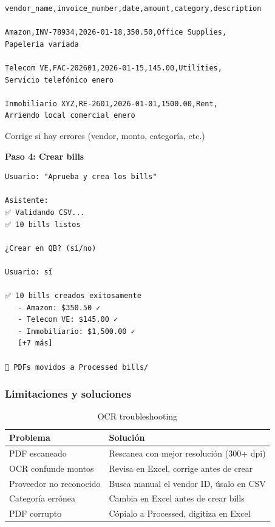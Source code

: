 \documentclass[12pt,oneside]{article}
\begin{document}
\begin{verbatim}
vendor_name,invoice_number,date,amount,category,description

Amazon,INV-78934,2026-01-18,350.50,Office Supplies,
Papelería variada

Telecom VE,FAC-202601,2026-01-15,145.00,Utilities,
Servicio telefónico enero

Inmobiliario XYZ,RE-2601,2026-01-01,1500.00,Rent,
Arriendo local comercial enero
\end{verbatim}

Corrige si hay errores (vendor, monto, categoría, etc.)

\textbf{Paso 4: Crear bills}

\begin{verbatim}
Usuario: "Aprueba y crea los bills"

Asistente:
✅ Validando CSV...
✅ 10 bills listos

¿Crear en QB? (sí/no)

Usuario: sí

✅ 10 bills creados exitosamente
   - Amazon: $350.50 ✓
   - Telecom VE: $145.00 ✓
   - Inmobiliario: $1,500.00 ✓
   [+7 más]

💾 PDFs movidos a Processed bills/
\end{verbatim}

\subsubsection{Limitaciones y soluciones}

\begin{table}[h]
\centering
\begin{tabular}{|p{3cm}|p{6cm}|}
\hline
\textbf{Problema} & \textbf{Solución} \\
\hline
PDF escaneado & Rescanea con mejor resolución (300+ dpi) \\
\hline
OCR confunde montos & Revisa en Excel, corrige antes de crear \\
\hline
Proveedor no reconocido & Busca manual el vendor ID, úsalo en CSV \\
\hline
Categoría errónea & Cambia en Excel antes de crear bills \\
\hline
PDF corrupto & Cópialo a Processed, digitiza en Excel \\
\hline
\end{tabular}
\caption{OCR troubleshooting}
\end{table}

\newpage
\end{document}
